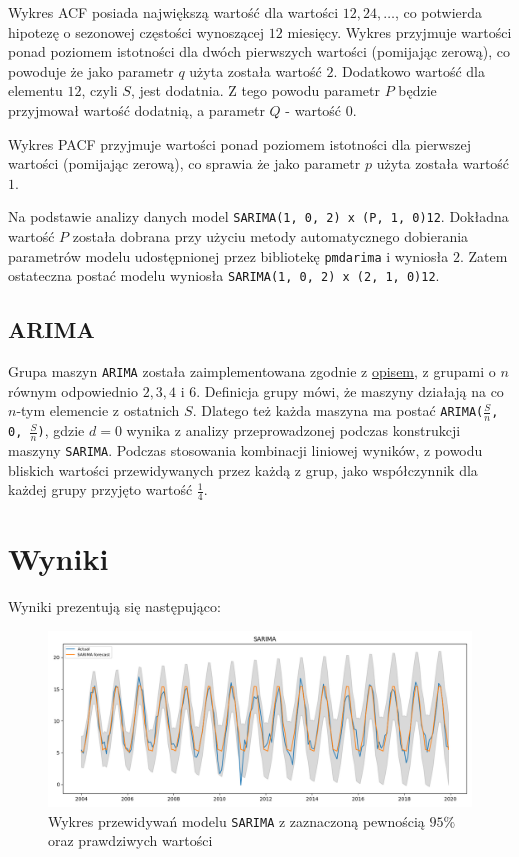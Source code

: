 \documentclass[12pt]{article}
\begin{document}
Wykres ACF posiada największą wartość dla wartości $12, 24, \dots$, co potwierda hipotezę o sezonowej częstości wynoszącej $12$ miesięcy. Wykres przyjmuje wartości ponad poziomem istotności dla dwóch pierwszych wartości (pomijając zerową), co powoduje że jako parametr $q$ użyta została wartość $2$. Dodatkowo wartość dla elementu $12$, czyli $S$, jest dodatnia. Z tego powodu parametr $P$ będzie przyjmował wartość dodatnią, a parametr $Q$ - wartość $0$.

Wykres PACF przyjmuje wartości ponad poziomem istotności dla pierwszej wartości (pomijając zerową), co sprawia że jako parametr $p$ użyta została wartość $1$.

Na podstawie analizy danych model \texttt{SARIMA(1, 0, 2) x (P, 1, 0)12}. Dokładna wartość $P$ została dobrana przy użyciu metody automatycznego dobierania parametrów modelu udostępnionej przez bibliotekę \texttt{pmdarima} i wyniosła $2$. Zatem ostateczna postać modelu wyniosła \texttt{SARIMA(1, 0, 2) x (2, 1, 0)12}.

\subsection{ARIMA}

Grupa maszyn \texttt{ARIMA} została zaimplementowana zgodnie z \hyperref[group-arima]{opisem}, z grupami o $n$ równym odpowiednio $2, 3, 4$ i $6$. Definicja grupy mówi, że maszyny działają na co $n$-tym elemencie z ostatnich $S$. Dlatego też każda maszyna ma postać \texttt{ARIMA($\frac{S}{n}$, 0, $\frac{S}{n}$)}, gdzie $d = 0$ wynika z analizy przeprowadzonej podczas konstrukcji maszyny \texttt{SARIMA}. Podczas stosowania kombinacji liniowej wyników, z powodu bliskich wartości przewidywanych przez każdą z grup, jako współczynnik dla każdej grupy przyjęto wartość $\frac{1}{4}$.

\section{Wyniki}

Wyniki prezentują się następująco:

\begin{figure}[H]
    \includegraphics[width=\textwidth]{img/sarima.png}
    \caption{Wykres przewidywań modelu \texttt{SARIMA} z zaznaczoną pewnością $95\%$ oraz prawdziwych wartości}
\end{figure}
\end{document}
